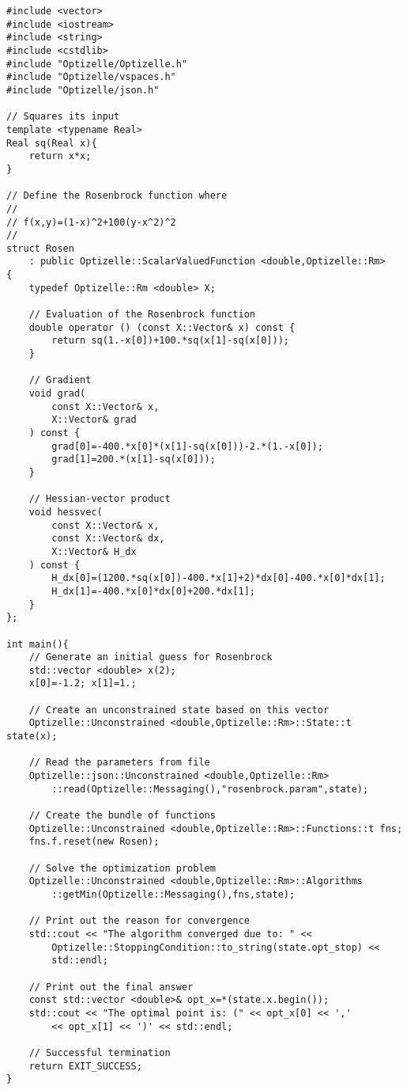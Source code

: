 \begin{lstlisting}[style=C++,caption={This example program minimizes the Rosenbrock function.  The code for this example can be found under \protect\path{cpp/examples/rosenbrock} in the installation directory.},label=lst:Rosen]
#include <vector>
#include <iostream>
#include <string>
#include <cstdlib>
#include "Optizelle/Optizelle.h"
#include "Optizelle/vspaces.h"
#include "Optizelle/json.h"

// Squares its input
template <typename Real>
Real sq(Real x){
    return x*x;
}

// Define the Rosenbrock function where
// 
// f(x,y)=(1-x)^2+100(y-x^2)^2
//
struct Rosen
    : public Optizelle::ScalarValuedFunction <double,Optizelle::Rm>
{
    typedef Optizelle::Rm <double> X;

    // Evaluation of the Rosenbrock function
    double operator () (const X::Vector& x) const {
        return sq(1.-x[0])+100.*sq(x[1]-sq(x[0]));
    }

    // Gradient
    void grad(
        const X::Vector& x,
        X::Vector& grad
    ) const {
        grad[0]=-400.*x[0]*(x[1]-sq(x[0]))-2.*(1.-x[0]);
        grad[1]=200.*(x[1]-sq(x[0]));
    }

    // Hessian-vector product
    void hessvec(
        const X::Vector& x,
        const X::Vector& dx,
        X::Vector& H_dx
    ) const {
        H_dx[0]=(1200.*sq(x[0])-400.*x[1]+2)*dx[0]-400.*x[0]*dx[1];
        H_dx[1]=-400.*x[0]*dx[0]+200.*dx[1];
    }
};

int main(){
    // Generate an initial guess for Rosenbrock
    std::vector <double> x(2);
    x[0]=-1.2; x[1]=1.;

    // Create an unconstrained state based on this vector
    Optizelle::Unconstrained <double,Optizelle::Rm>::State::t state(x);

    // Read the parameters from file
    Optizelle::json::Unconstrained <double,Optizelle::Rm>
        ::read(Optizelle::Messaging(),"rosenbrock.param",state);

    // Create the bundle of functions 
    Optizelle::Unconstrained <double,Optizelle::Rm>::Functions::t fns;
    fns.f.reset(new Rosen);

    // Solve the optimization problem
    Optizelle::Unconstrained <double,Optizelle::Rm>::Algorithms
        ::getMin(Optizelle::Messaging(),fns,state);

    // Print out the reason for convergence
    std::cout << "The algorithm converged due to: " <<
        Optizelle::StoppingCondition::to_string(state.opt_stop) <<
        std::endl;

    // Print out the final answer
    const std::vector <double>& opt_x=*(state.x.begin());
    std::cout << "The optimal point is: (" << opt_x[0] << ','
        << opt_x[1] << ')' << std::endl;

    // Successful termination
    return EXIT_SUCCESS;
}
\end{lstlisting}
